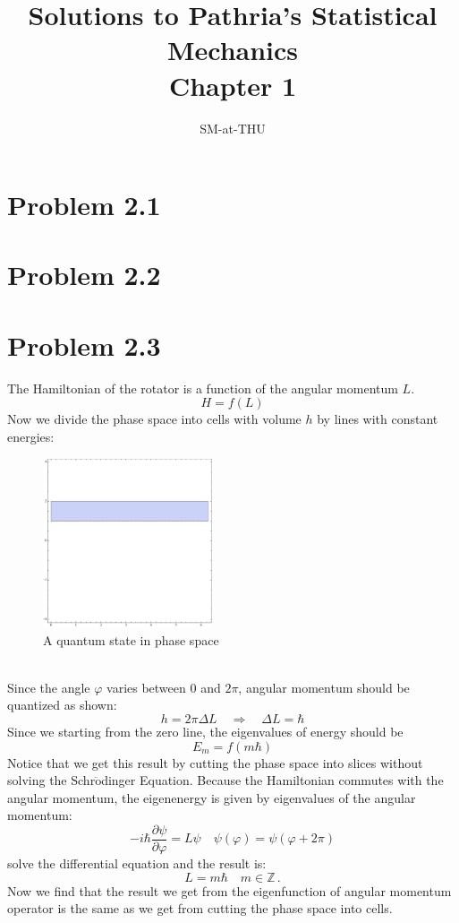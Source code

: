 \documentclass{article}
\author{SM-at-THU}
\title{\bf{Solutions to Pathria's Statistical Mechanics}\\Chapter 1}
\begin{document}
\maketitle
\section*{Problem 2.1}

\section*{Problem 2.2}

\section*{Problem 2.3}
The Hamiltonian of the rotator is a function of the angular momentum $L$. 
$$
H = f(L)
$$
Now we divide the phase space into cells with volume $h$ by lines with constant energies:
\begin{figure}[!htp]
\centering
\includegraphics[width=5cm]{./figures/2.3-2.5/pic2.pdf}
\caption{A quantum state in phase space}
\end{figure}\\
Since the angle $\varphi$ varies between $0$ and $2\pi$, angular momentum should be quantized as shown:
$$
h = 2\pi\Delta L\quad \Rightarrow \quad \Delta L =\hbar
$$
Since we starting from the zero line, the eigenvalues of energy should be
\begin{equation}
E_m = f(m\hbar)
\end{equation}
Notice that we get this result by cutting the phase space into slices without solving the Schr$\ddot{\mathrm{o}}$dinger Equation. Because the Hamiltonian commutes with the angular momentum, the eigenenergy is given by eigenvalues of the angular momentum:
$$
-i\hbar \frac{\partial \psi}{\partial\varphi} = L\psi\quad\psi(\varphi) =\psi(\varphi+2\pi)
$$
solve the differential equation and the result is:
$$
L = m\hbar\quad m \in \mathbb{Z}\,.
$$
Now we find that the result we get from the eigenfunction of angular momentum operator is the same as we get from cutting the phase space into cells.
\end{document}
